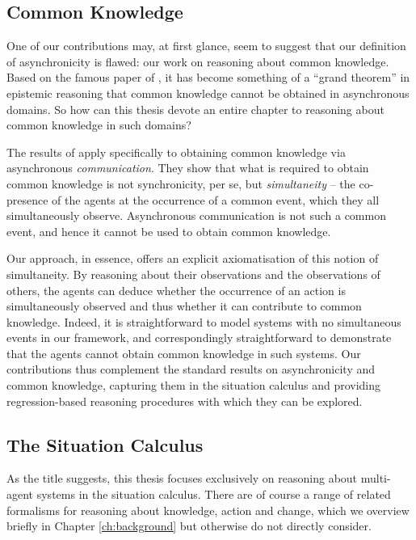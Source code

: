 \subsection{Common Knowledge}

One of our contributions may, at first glance, seem to suggest that
our definition of asynchronicity is flawed: our work on reasoning
about common knowledge. Based on the famous paper of \citet{halpern90knowledge_distrib},
it has become something of a {}``grand theorem'' in
epistemic reasoning that common knowledge cannot be obtained in asynchronous
domains. So how can this thesis devote an entire chapter to reasoning
about common knowledge in such domains?

The results of \citep{halpern90knowledge_distrib} apply specifically
to obtaining common knowledge via asynchronous \emph{communication}.
They show that what is required to obtain common knowledge is not
synchronicity, per se, but \emph{simultaneity} -- the co-presence
of the agents at the occurrence of a common event, which they all
simultaneously observe. Asynchronous communication is not such a common
event, and hence it cannot be used to obtain common knowledge.

Our approach, in essence, offers an explicit axiomatisation of this
notion of simultaneity. By reasoning about their observations and
the observations of others, the agents can deduce whether the occurrence
of an action is simultaneously observed and thus whether it can contribute
to common knowledge. Indeed, it is straightforward to model systems
with no simultaneous events in our framework, and correspondingly
straightforward to demonstrate that the agents cannot obtain common
knowledge in such systems. Our contributions thus complement the standard
results on asynchronicity and common knowledge, capturing them in
the situation calculus and providing regression-based reasoning procedures
with which they can be explored.


\subsection{The Situation Calculus}

As the title suggests, this thesis focuses exclusively on reasoning
about multi-agent systems in the situation calculus. There are of
course a range of related formalisms for reasoning about knowledge,
action and change, which we overview briefly in Chapter \ref{ch:background}
but otherwise do not directly consider.

